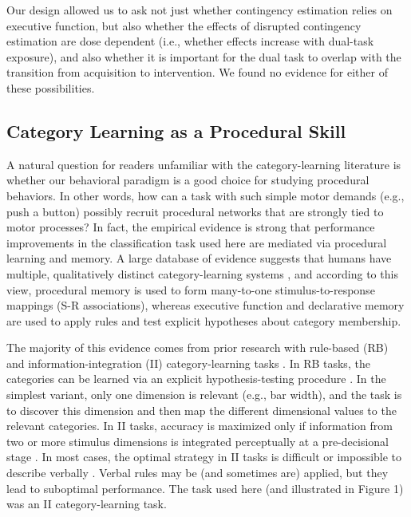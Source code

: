 \documentclass[apacite,draftfirst,man]{apa6}
\begin{document}
Our design allowed us to ask not just whether contingency estimation relies on
executive function, but also whether the effects of disrupted contingency
estimation are dose dependent (i.e., whether effects increase with dual-task
exposure), and also whether it is important for the dual task to overlap with
the transition from acquisition to intervention. We found no evidence for either
of these possibilities.

\subsection*{Category Learning as a Procedural Skill}
A natural question for readers unfamiliar with the category-learning literature
is whether our behavioral paradigm is a good choice for studying procedural
behaviors. In other words, how can a task with such simple motor demands (e.g.,
push a button) possibly recruit procedural networks that are strongly tied to
motor processes? In fact, the empirical evidence is strong that performance
improvements in the classification task used here are mediated via procedural
learning and memory. A large database of evidence suggests that humans have
multiple, qualitatively distinct category-learning systems \cite{AshbyCOVIS1998,
AshbyMaddox2005, EricksonKruschke1998}, and according to this view, procedural
memory is used to form many-to-one stimulus-to-response mappings (S-R
associations), whereas executive function and declarative memory are used to
apply rules and test explicit hypotheses about category membership.

The majority of this evidence comes from prior research with rule-based (RB) and
information-integration (II) category-learning tasks \cite{HelieRoederAshby2010,
NomuraEtAl2007, SotoEtAl2013, WaldschmidtAshby2011}. In RB tasks, the categories
can be learned via an explicit hypothesis-testing procedure
\cite{AshbyCOVIS1998}. In the simplest variant, only one dimension is relevant
(e.g., bar width), and the task is to discover this dimension and then map the
different dimensional values to the relevant categories. In II tasks, accuracy
is maximized only if information from two or more stimulus dimensions is
integrated perceptually at a pre-decisional stage \cite{AshbyGott1988}. In most
cases, the optimal strategy in II tasks is difficult or impossible to describe
verbally \cite{AshbyCOVIS1998}. Verbal rules may be (and sometimes are) applied,
but they lead to suboptimal performance. The task used here (and illustrated in
Figure 1) was an II category-learning task.
\end{document}

